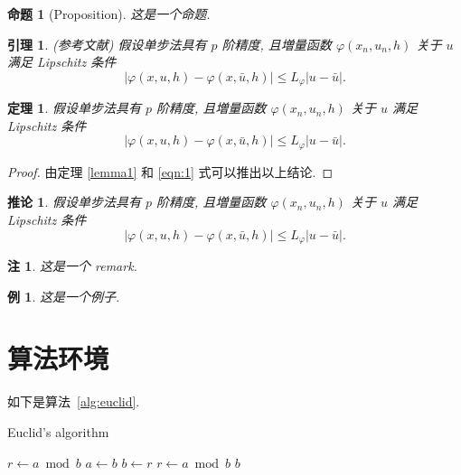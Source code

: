 \documentclass[UTF8,openany,twoside,12pt]{book}
\theoremstyle{plain}
\newtheorem{proposition}{命题}[chapter]
\newtheorem{lemma}{引理}[chapter]
\newtheorem{theorem}{定理}[chapter]
\newtheorem{example}{例}[chapter]
\newtheorem{corollary}{推论}[chapter]
\newtheorem{remark}{注}[chapter]
\begin{document}
\begin{proposition}[Proposition]
这是一个命题.
\end{proposition}

\begin{lemma}\label{lemma-convergence} {\rm (\textit{参考文献}\cite{LiLiu1997})}
假设单步法具有 $p$ 阶精度, 且増量函数 $\varphi(x_{n}, u_{n}, h)$ 关于 $u$ 满足 {\rm Lipschitz} 条件
\begin{equation}\label{eqn:3}
|\varphi(x, u, h)-\varphi(x, \bar{u}, h)| \leqslant L_{\varphi}|u-\bar{u}|.
\end{equation}
\end{lemma}

\begin{theorem}\label{theorem-convergence}
假设单步法具有 $p$ 阶精度, 且増量函数 $\varphi(x_{n}, u_{n}, h)$ 关于 $u$ 满足 {\rm Lipschitz} 条件
\begin{equation}\label{eqn:4}
|\varphi(x, u, h)-\varphi(x, \bar{u}, h)| \leqslant L_{\varphi}|u-\bar{u}|.
\end{equation}
\end{theorem}
\begin{proof}
由定理 \ref{lemma1} 和 \eqref{eqn:1} 式可以推出以上结论.
\end{proof}

\begin{corollary}\label{col-convergence}
假设单步法具有 $p$ 阶精度, 且増量函数 $\varphi(x_{n}, u_{n}, h)$ 关于 $u$ 满足 {\rm Lipschitz} 条件
\begin{equation}\label{eqn:5}
|\varphi(x, u, h)-\varphi(x, \bar{u}, h)| \leqslant L_{\varphi}|u-\bar{u}|.
\end{equation}
\end{corollary}


\begin{remark}\label{remark1}
这是一个 remark.
\end{remark}

\begin{example}
这是一个例子.
\end{example}


\clearpage
\section{算法环境}

如下是算法~\ref{alg:euclid}.
\begin{algorithm}[!htbp]
    \small
    \caption{Euclid's algorithm}\label{alg:euclid}
    \begin{algorithmic}[1]
        \State $r\gets a\bmod b$
        \State $a\gets b$
        \State $b\gets r$
        \State $r\gets a\bmod b$
        \EndWhile\label{euclidendwhile}
        \State \Return $b$
        \EndProcedure
    \end{algorithmic}
\end{algorithm}
\end{document}
